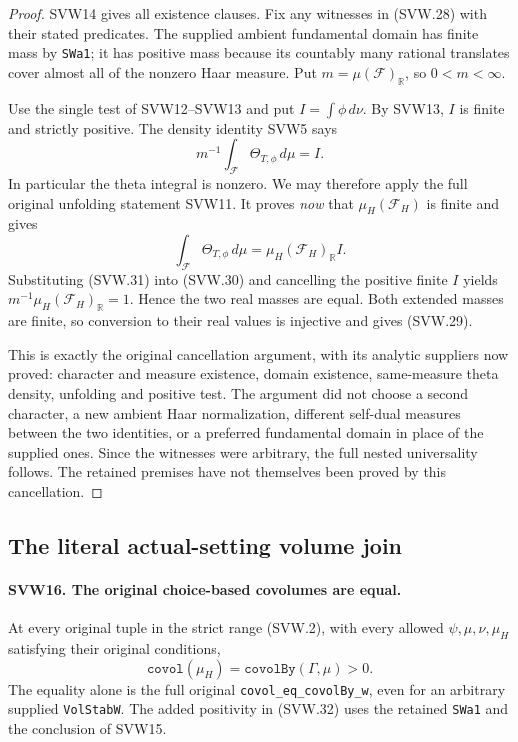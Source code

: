 \begin{proof}
SVW14 gives all existence clauses.  Fix any witnesses in (SVW.28)
with their stated predicates.  The supplied ambient fundamental
domain has finite mass by \texttt{SWa1}; it has positive mass
because its countably many rational translates cover almost all
of the nonzero Haar measure.  Put $m=\mu(\mathcal F)_{\mathbb R}$,
so $0<m<\infty$.

Use the single test of SVW12--SVW13 and put
$I=\int\phi\,d\nu$.  By SVW13, $I$ is finite and strictly
positive.  The density identity SVW5 says
\[
                    m^{-1}\int_{\mathcal F}\Theta_{T,\phi}\,d\mu=I.
 \tag{SVW.30}
\]
In particular the theta integral is nonzero.  We may therefore
apply the full original unfolding statement SVW11.  It proves
\emph{now} that $\mu_H(\mathcal F_H)$ is finite and gives
\[
 \int_{\mathcal F}\Theta_{T,\phi}\,d\mu
                        =\mu_H(\mathcal F_H)_{\mathbb R}I.
 \tag{SVW.31}
\]
Substituting (SVW.31) into (SVW.30) and cancelling the positive
finite $I$ yields
$m^{-1}\mu_H(\mathcal F_H)_{\mathbb R}=1$.  Hence the two real
masses are equal.  Both extended masses are finite, so conversion
to their real values is injective and gives (SVW.29).

This is exactly the original cancellation argument, with its
analytic suppliers now proved: character and measure existence,
domain existence, same-measure theta density, unfolding and
positive test.  The argument did not choose a second character,
a new ambient Haar normalization, different self-dual measures
between the two identities, or a preferred fundamental domain
in place of the supplied ones.  Since the witnesses were arbitrary,
the full nested universality follows.  The retained premises have
not themselves been proved by this cancellation.
\end{proof}

\subsection{The literal actual-setting volume join}

\paragraph{SVW16. The original choice-based covolumes are equal.}
\label{claim:SVW16}
At every original tuple in the strict range (SVW.2), with every
allowed $\psi,\mu,\nu,\mu_H$ satisfying their original conditions,
\[
       \texttt{covol}(\mu_H)
           =\texttt{covolBy}(\Gamma,\mu)>0.
 \tag{SVW.32}
\]
The equality alone is the full original
\texttt{covol\_eq\_covolBy\_w}, even for an arbitrary supplied
\texttt{VolStabW}.  The added positivity in (SVW.32) uses the
retained \texttt{SWa1} and the conclusion of SVW15.

